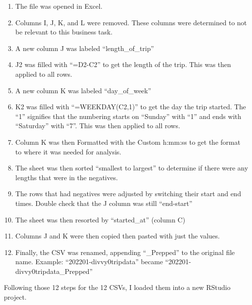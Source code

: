 \documentclass[
]{article}
\providecommand{\tightlist}{%
  \setlength{\itemsep}{0pt}\setlength{\parskip}{0pt}}
\begin{document}
\begin{enumerate}
\def\labelenumi{\arabic{enumi}.}
\tightlist
\item
  The file was opened in Excel.
\item
  Columns I, J, K, and L were removed. These columns were determined to
  not be relevant to this business task.
\item
  A new column J was labeled ``length\_of\_trip''
\item
  J2 was filled with ``=D2-C2'' to get the length of the trip. This was
  then applied to all rows.
\item
  A new column K was labeled ``day\_of\_week''
\item
  K2 was filled with ``=WEEKDAY(C2,1)'' to get the day the trip started.
  The ``1'' signifies that the numbering starts on ``Sunday'' with ``1''
  and ends with ``Saturday'' with ``7''. This was then applied to all
  rows.
\item
  Column K was then Formatted with the Custom h:mm:ss to get the format
  to where it was needed for analysis.
\item
  The sheet was then sorted ``smallest to largest'' to determine if
  there were any lengths that were in the negatives.
\item
  The rows that had negatives were adjusted by switching their start and
  end times. Double check that the J column was still ``end-start''
\item
  The sheet was then resorted by ``started\_at'' (column C)
\item
  Columns J and K were then copied then pasted with just the values.
\item
  Finally, the CSV was renamed, appending ``\_Prepped'' to the original
  file name. Example: ``202201-divvy0tripdata'' became
  ``202201-divvy0tripdata\_Prepped''
\end{enumerate}

Following those 12 steps for the 12 CSVs, I loaded them into a new
RStudio project.
\end{document}
